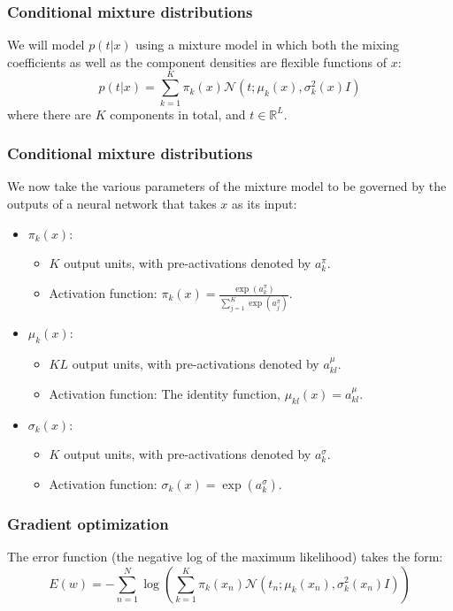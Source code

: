 \documentclass{beamer}
\begin{document}
\begin{frame}
    \frametitle{Conditional mixture distributions}
    We will model $p(t|x)$ using a mixture model in which both the mixing coefficients as well as the component densities are flexible functions of $x$:
    \begin{equation*}
        p(t|x)=\sum_{k=1}^{K}\pi_{k}(x)\mathcal{N}(t;\mu_{k}(x),\sigma^{2}_{k}(x)I)
    \end{equation*}
    where there are $K$ components in total, and $t\in\mathbb{R}^{L}$.
\end{frame}

\begin{frame}
    \frametitle{Conditional mixture distributions}
    We now take the various parameters of the mixture model to be governed by the outputs of a neural network that takes $x$ as its input:
    \begin{itemize}
        \item $\pi_{k}(x)$:
        \begin{itemize}
            \item $K$ output units, with pre-activations denoted by $a^{\pi}_{k}$.
            \item Activation function: $\pi_{k}(x)=\frac{\exp(a^{\pi}_{k})}{\sum_{j=1}^{K}\exp(a^{\pi}_{j})}$.
        \end{itemize}
        \item $\mu_{k}(x)$:
        \begin{itemize}
            \item $KL$ output units, with pre-activations denoted by $a^{\mu}_{kl}$.
            \item Activation function: The identity function, $\mu_{kl}(x)=a^{\mu}_{kl}$.
        \end{itemize}
        \item $\sigma_{k}(x)$:
        \begin{itemize}
            \item $K$ output units, with pre-activations denoted by $a^{\sigma}_{k}$.
            \item Activation function: $\sigma_{k}(x)=\exp(a^{\sigma}_{k})$.
        \end{itemize}
    \end{itemize}
\end{frame}

\begin{frame}
    \frametitle{Gradient optimization}
    The error function (the negative log of the maximum likelihood) takes the form:
    \begin{equation*}
        E(w)=-\sum_{n=1}^{N}\log(\sum_{k=1}^{K}\pi_{k}(x_{n})\mathcal{N}(t_{n};\mu_{k}(x_{n}),\sigma^{2}_{k}(x_{n})I))
    \end{equation*}
\end{frame}
\end{document}
